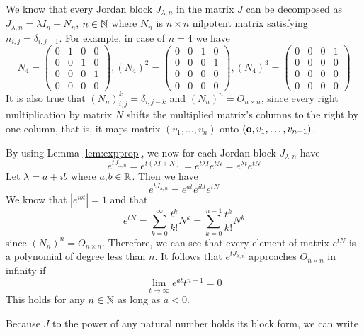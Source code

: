 We know that every Jordan block $J_{\lambda,n}$ in the matrix $J$ can be decomposed as $J_{\lambda,n}=\lambda I_n+N_n$, $n \in\mathbb{N}$ where $N_n$ is $n \times n$ nilpotent matrix satisfying $n_{i,j}=\delta_{i,j-1}$. For example, in case of $n=4$ we have
\begin{equation*}
	N_4=
	\begin{pmatrix}
		0 & 1 & 0 & 0 \\
		0 & 0 & 1 & 0 \\
		0 & 0 & 0 & 1 \\
		0 & 0 & 0 & 0 
	\end{pmatrix},
	(N_4)^2=
	\begin{pmatrix}
		0 & 0 & 1 & 0 \\
		0 & 0 & 0 & 1 \\
		0 & 0 & 0 & 0 \\
		0 & 0 & 0 & 0 
	\end{pmatrix},
	(N_4)^3=
	\begin{pmatrix}
		0 & 0 & 0 & 1 \\
		0 & 0 & 0 & 0 \\
		0 & 0 & 0 & 0 \\
		0 & 0 & 0 & 0 
	\end{pmatrix}
\end{equation*}
It is also true that $(N_n)^k_{i,j}=\delta_{i,j-k}$ and $(N_n)^n=O_{n \times n}$, since every right multiplication by matrix $N$ shifts the multiplied matrix's columns to the right by one column, that is, it maps matrix $(v_1,\ldots,v_n)$ onto $(\textbf{o},v_1,\ldots,v_{n-1})$. 

By using Lemma \ref{lem:expprop}, we now for each Jordan block $J_{\lambda,n}$ have $$e^{tJ_{\lambda,n}}=e^{t(\lambda I + N)}=e^{t\lambda I}e^{tN}=e^{\lambda t}e^{tN}$$ Let $\lambda = a+ib$ where $a$,$b \in \mathbb{R}$. Then we have $$e^{tJ_{\lambda,n}}=e^{at}e^{ibt}e^{tN}$$ We know that $|e^{ibt}|=1$ and that $$e^{tN}=\sum^\infty_{k=0}\frac{t^k}{k!}N^k=\sum^{n-1}_{k=0}\frac{t^k}{k!}N^k$$ since $(N_n)^n=O_{n \times n}$. Therefore, we can see that every element of matrix $e^{tN}$ is a polynomial of degree less than $n$. It follows that $e^{tJ_{\lambda,n}}$ approaches $O_{n \times n}$ in infinity if $$\lim_{t\to\infty}e^{at}t^{n-1}=0$$ This holds for any $n\in\mathbb{N}$ as long as $a<0$. 

Because $J$ to the power of any natural number holds its block form, we can write


